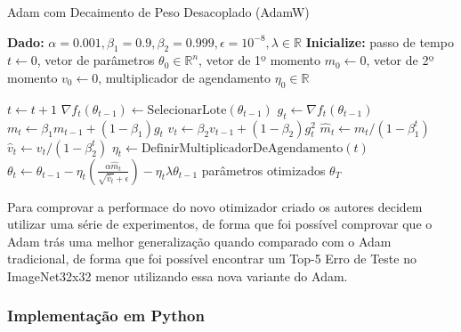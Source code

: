 \begin{algorithm}[H]
    \caption{Adam com Decaimento de Peso Desacoplado (AdamW)}
    \label{alg:adamw}
    \begin{algorithmic}[1]

    \State \textbf{Dado:} $\alpha=0.001, \beta_1=0.9, \beta_2=0.999, \epsilon=10^{-8}, \lambda \in \mathbb{R}$
    \State \textbf{Inicialize:} passo de tempo $t \leftarrow 0$, vetor de parâmetros $\theta_0 \in \mathbb{R}^n$, vetor de 1º momento $m_0 \leftarrow 0$, vetor de 2º momento $v_0 \leftarrow 0$, multiplicador de agendamento $\eta_0 \in \mathbb{R}$

    \Repeat
        \State $t \leftarrow t + 1$
        \State $\nabla f_t(\theta_{t-1}) \leftarrow \text{SelecionarLote}(\theta_{t-1})$ 
        \State $g_t \leftarrow \nabla f_t(\theta_{t-1})$ 
        \State $m_t \leftarrow \beta_1 m_{t-1} + (1 - \beta_1) g_t$ 
        \State $v_t \leftarrow \beta_2 v_{t-1} + (1 - \beta_2) g_t^2$ 
        \State $\hat{m}_t \leftarrow m_t / (1 - \beta_1^t)$ 
        \State $\hat{v}_t \leftarrow v_t / (1 - \beta_2^t)$ 
        \State $\eta_t \leftarrow \text{DefinirMultiplicadorDeAgendamento}(t)$ 
        \State $\theta_t \leftarrow \theta_{t-1} - \eta_t \left( \frac{\alpha \hat{m}_t}{\sqrt{\hat{v}_t} + \epsilon} \right) - \eta_t \lambda \theta_{t-1}$ 
    \State \Return parâmetros otimizados $\theta_T$
    \end{algorithmic}
\end{algorithm}

Para comprovar a performace do novo otimizador criado os autores decidem utilizar uma série de experimentos, de forma que foi possível comprovar que o Adam trás uma melhor generalização quando comparado com o Adam tradicional, de forma que foi possível encontrar um Top-5 Erro de Teste no ImageNet32x32 menor utilizando essa nova variante do Adam.

\subsubsection{Implementação em Python}

